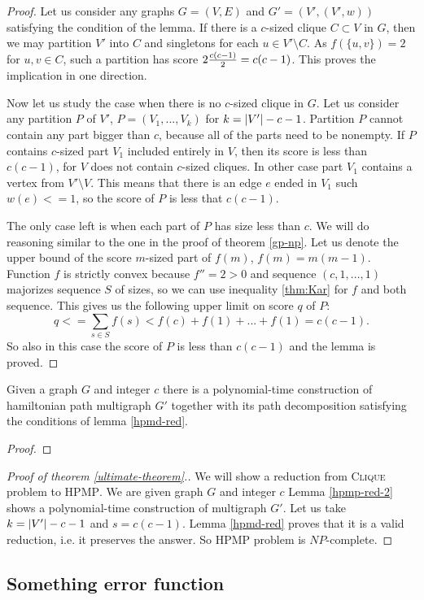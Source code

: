 \begin{proof} \label{hpmp-red-2}
Let us consider any graphs $G=(V,E)$ and $G'=(V',(V',w))$ satisfying the condition of the lemma.
If there is a $c$-sized clique $C \subset V$ in $G$,
then we may partition $V'$ into $C$ and singletons for each $u \in V' \setminus C$.
As $f(\{u,v\})=2$ for $u,v \in C$, such a partition has score $2 {c(c-1) \over 2} = c(c-1)$.
This proves the implication in one direction.

Now let us study the case when there is no $c$-sized clique in $G$.
Let us consider any partition $P$ of $V'$, $P=(V_1, ..., V_k)$ for $k = \left\vert V' \right\vert-c-1$.
Partition $P$ cannot contain any part bigger than $c$,
because all of the parts need to be nonempty.
If $P$ contains $c$-sized part $V_1$ included entirely in $V$, then its score is less than $c(c-1)$,
for $V$ does not contain $c$-sized cliques.
In other case part $V_1$ contains a vertex from $V' \setminus V$.
This means that there is an edge $e$ ended in $V_1$ such $w(e)<=1$, so the score of $P$ is less that $c(c-1)$.

The only case left is when each part of $P$ has size less than $c$.
We will do reasoning similar to the one in the proof of theorem \ref{gp-np}.
Let us denote the upper bound of the score $m$-sized part of $f(m)$, $f(m) = m(m-1)$.
Function $f$ is strictly convex because $f'' = 2 > 0$
and sequence $(c,1,...,1)$ majorizes sequence $S$ of sizes, so we can use inequality \ref{thm:Kar}
for $f$ and both sequence.
This gives us the following upper limit on score $q$ of $P$:
$$q <= \sum_{s \in S} f(s) < f(c) + f(1) + ... + f(1) = c(c-1) \text{.}$$
So also in this case the score of $P$ is less than $c(c-1)$ and the lemma is proved.
\end{proof}

\begin{lmm}
Given a graph $G$ and integer $c$ there is a polynomial-time construction
of hamiltonian path multigraph $G'$ together with its path decomposition
satisfying the conditions of lemma \ref{hpmd-red}.
\end{lmm}

\begin{proof}
\end{proof}

\begin{proof}[Proof of theorem \ref{ultimate-theorem}.]
We will show a reduction from \textsc{Clique} problem to \textsc{HPMP}.
We are given graph $G$ and integer $c$
Lemma \ref{hpmp-red-2} shows a polynomial-time construction of multigraph $G'$.
Let us take $k=\left\vert V' \right\vert-c-1$ and $s=c(c-1)$.
Lemma \ref{hpmd-red} proves that it is a valid reduction, i.e. it preserves the answer.
So \textsc{HPMP} problem is $NP$-complete.
\end{proof}

\subsection{Something error function}